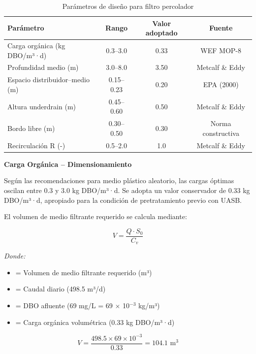 \documentclass[12pt,a4paper]{article}
\begin{document}
\begin{table}[H]
\centering
\caption{Parámetros de diseño para filtro percolador}
\begin{tabular}{lccc}
\toprule
\textbf{Parámetro} & \textbf{Rango} & \textbf{Valor adoptado} & \textbf{Fuente} \\
\midrule
Carga orgánica (kg DBO/m³·d) & 0.3--3.0 & 0.33 & WEF MOP-8 \\
Profundidad medio (m) & 3.0--8.0 & 3.50 & Metcalf \& Eddy \\
Espacio distribuidor--medio (m) & 0.15--0.23 & 0.20 & EPA (2000) \\
Altura underdrain (m) & 0.45--0.60 & 0.50 & Metcalf \& Eddy \\
Bordo libre (m) & 0.30--0.50 & 0.30 & Norma constructiva \\
Recirculación R (-) & 0.5--2.0 & 1.0 & Metcalf \& Eddy \\
\bottomrule
\end{tabular}
\end{table}

\textbf{Carga Orgánica -- Dimensionamiento}

Según las recomendaciones para medio plástico aleatorio, las cargas óptimas oscilan entre 0.3 y 3.0 kg DBO/m³·d. Se adopta un valor conservador de 0.33 kg DBO/m³·d, apropiado para la condición de pretratamiento previo con UASB.

El volumen de medio filtrante requerido se calcula mediante:

\begin{equation}
V = \frac{Q \cdot S_0}{C_v}
\end{equation}

\textit{Donde:}
\begin{itemize}[noitemsep,leftmargin=2em]
    \item[$V$] = Volumen de medio filtrante requerido (m³)
    \item[$Q$] = Caudal diario (498.5 m³/d)
    \item[$S_0$] = DBO afluente (69 mg/L = 69 $\times$ 10$^{-3}$ kg/m³)
    \item[$C_v$] = Carga orgánica volumétrica (0.33 kg DBO/m³·d)
\end{itemize}

\begin{equation}
V = \frac{498.5 \times 69 \times 10^{-3}}{0.33} = 104.1 \text{ m}^3
\end{equation}
\end{document}
